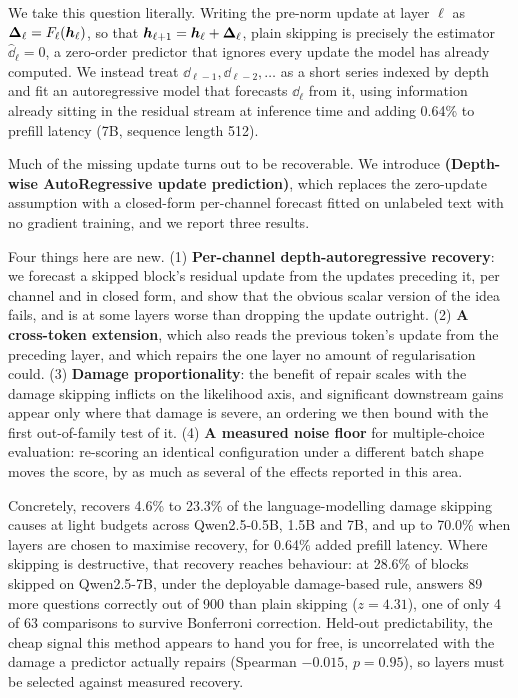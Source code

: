 We take this question literally. Writing the pre-norm update at layer $\ell$ as
$\bm{\Delta}_\ell = F_\ell(\bm{h}_\ell)$, so that $\bm{h}_{\ell+1} = \bm{h}_\ell + \bm{\Delta}_\ell$, plain
skipping is precisely the estimator $\widehat{\dd}_\ell = 0$, a zero-order predictor that
ignores every update the model has already computed. We instead treat $\dd_{\ell-1},
\dd_{\ell-2}, \dots$ as a short series indexed by depth and fit an autoregressive model
that forecasts $\dd_\ell$ from it, using information already sitting in the residual
stream at inference time and adding 0.64\% to prefill latency (7B, sequence length
512).

Much of the missing update turns out to be recoverable. We introduce \textbf{\mname
(Depth-wise AutoRegressive update prediction)}, which replaces the zero-update assumption
with a closed-form per-channel forecast fitted on unlabeled text with no gradient
training, and we report three results.

Four things here are new. (1) \textbf{Per-channel depth-autoregressive recovery}: we forecast a
skipped block's residual update from the updates preceding it, per channel and in closed form,
and show that the obvious scalar version of the idea fails, and is at some layers worse than
dropping the update outright. (2) \textbf{A cross-token extension}, which also reads the previous
token's update from the preceding layer, and which repairs the one layer no amount of
regularisation could. (3) \textbf{Damage proportionality}: the benefit of repair scales with the
damage skipping inflicts on the likelihood axis, and significant downstream gains appear only
where that damage is severe,
an ordering we then bound with the first out-of-family test of it. (4) \textbf{A measured noise
floor} for multiple-choice evaluation: re-scoring an identical configuration under a different
batch shape moves the score, by as much as several of the effects reported in this area.

Concretely, \mname recovers 4.6\% to 23.3\% of the language-modelling damage skipping causes at
light budgets across Qwen2.5-0.5B, 1.5B and 7B, and up to 70.0\% when layers are chosen to
maximise recovery, for 0.64\% added prefill latency. Where skipping is destructive, that recovery
reaches behaviour: at 28.6\% of blocks skipped on Qwen2.5-7B, under the deployable damage-based
rule, \mname answers 89 more questions correctly out of 900 than plain skipping ($z=4.31$), one
of only 4 of 63 comparisons to survive Bonferroni correction. Held-out predictability, the cheap
signal this method appears to hand you for free, is uncorrelated with the damage a predictor
actually repairs (Spearman $-0.015$, $p=0.95$), so layers must be selected against measured
recovery.
